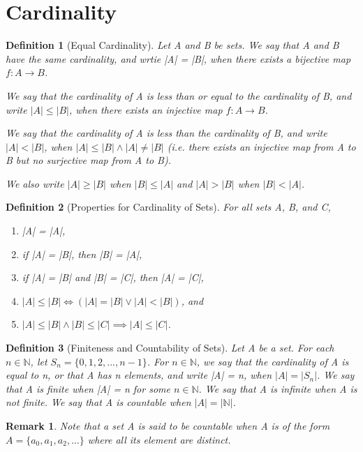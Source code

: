 \documentclass[11pt, oneside]{book}
\theoremstyle{break}
\newtheorem*{remark}{Remark}
\newtheorem{defn}{Definition}[section]
\newcommand{\bb}[1]{\mathbb{#1}}			%
\begin{document}
\section{Cardinality}

\begin{defn}[Equal Cardinality]
	Let A and B be sets. We say that A and B have the same cardinality, and wrtie |A| = |B|, when there exists a bijective map $f: A \to B$.

	We say that the cardinality of A is less than or equal to the cardinality of B, and write $|A| \leq |B|$, when there exists an injective map $f: A \to B$.

	We say that the cardinality of A is less than the cardinality of B, and write $|A| < |B|$, when $|A| \leq |B| \land |A| \neq |B|$ (i.e. there exists an injective map from A to B but no surjective map from A to B).

	We also write $|A| \geq |B|$ when $|B| \leq |A|$ and $|A| > |B|$ when $|B| < |A|$.
\end{defn}

\begin{defn}[Properties for Cardinality of Sets]
	For all sets A, B, and C,
	\begin{enumerate}
		\item |A| = |A|,
		\item if |A| = |B|, then |B| = |A|,
		\item if |A| = |B| and |B| = |C|, then |A| = |C|,
		\item $|A| \leq |B| \iff (|A| = |B| \lor |A| < |B|)$, and
		\item $|A| \leq |B| \land |B| \leq |C| \implies |A| \leq |C|$.
	\end{enumerate}
\end{defn}

\begin{defn}[Finiteness and Countability of Sets]
	Let A be a set. For each $n \in \bb{N}$, let $S_n = \{0, 1, 2, ..., n - 1\}$. For $n \in \bb{N}$, we say that the cardinality of A is equal to n, or that A has n elements, and write |A| = n, when $|A| = |S_n|$. We say that A is finite when |A| = n for some $n \in \bb{N}$. We say that A is infinite when A is not finite. We say that A is countable when $|A| = |\bb{N}|$.
\end{defn}

\begin{remark}
	Note that a set A is said to be countable when A is of the form $A = \{a_0, a_1, a_2, ...\}$ where all its element are distinct.
\end{remark}
\end{document}
